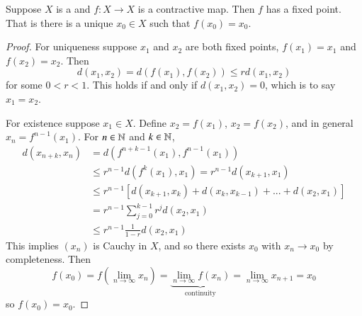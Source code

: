 \begin{namthm}
    Suppose $X$ is a  and $f:X\rightarrow X$ is a contractive map. Then $f$ has a  fixed point. That is there is a unique $x_0 \in X$ such that $f(x_0) = x_0$.
\end{namthm}
\begin{proof}
    For uniqueness suppose $x_1$ and $x_2$ are both fixed points, $f(x_1) = x_1$ and $f(x_2) = x_2$. Then $$d(x_1,x_2) = d(f(x_1),f(x_2)) \leq rd(x_1,x_2)$$ for some $0 < r < 1$. This holds if and only if $d(x_1,x_2) = 0$, which is to say $x_1 = x_2$. 

    For existence suppose $x_1 \in X$. Define $x_2 = f(x_1)$, $x_2 = f(x_2)$, and in general $x_n = f^{n-1}(x_1)$. For $n \in \mathbb N$ and $k \in \mathbb N$, \begin{align*}
        d(x_{n+k},x_n) &= d(f^{n+k-1}(x_1),f^{n-1}(x_1)) \\
        &\leq r^{n-1}d(f^k(x_1),x_1) = r^{n-1}d(x_{k+1},x_1) \\
        &\leq r^{n-1}[d(x_{k+1},x_k)+d(x_k,x_{k-1})+...+d(x_2,x_1)] \\
        &=r^{n-1}\sum_{j=0}^{k-1}r^jd(x_2,x_1) \\
        &\leq r^{n-1}\frac{1}{1-r}d(x_2,x_1)
    \end{align*}
    This implies $(x_n)$ is Cauchy in $X$, and so there exists $x_0$ with $x_n\rightarrow x_0$ by completeness. Then $$f(x_0) = f(\lim\limits_{n\rightarrow \infty}x_n) = \underbrace{\lim\limits_{n\rightarrow\infty}f(x_n)}_{\text{continuity}} = \lim\limits_{n\rightarrow \infty}x_{n+1} = x_0$$ so $f(x_0) = x_0$.
\end{proof}


